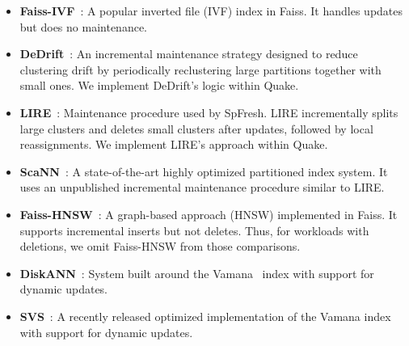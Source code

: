 \begin{itemize}[leftmargin=*, itemsep=-.25em, topsep=0pt]
    \item \textbf{Faiss-IVF}~\cite{douze2024faisslibrary}: A popular inverted file (IVF) index in Faiss. It handles updates but does no maintenance.
    \item \textbf{DeDrift}~\cite{baranchuk_dedrift_2023}: An incremental maintenance strategy designed to reduce clustering drift by periodically reclustering large partitions together with small ones. We implement DeDrift’s logic within Quake.
    \item \textbf{LIRE}~\cite{xu_spfresh_2023}: Maintenance procedure used by SpFresh. LIRE incrementally splits large clusters and deletes small clusters after updates, followed by local reassignments. We implement LIRE’s approach within Quake.
    \item \textbf{ScaNN}~\cite{guo_accelerating_2020}: A state-of-the-art highly optimized partitioned index system. It uses an unpublished incremental maintenance procedure similar to LIRE.
    \item \textbf{Faiss-HNSW}~\cite{10.1109/TPAMI.2018.2889473}: A graph-based approach (HNSW) implemented in Faiss. It supports incremental inserts but not deletes. Thus, for workloads with deletions, we omit Faiss-HNSW from those comparisons.
    \item \textbf{DiskANN}~\cite{singh2021freshdiskann}: System built around the Vamana~\cite{10.5555/3454287.3455520} index with support for dynamic updates.
    \item \textbf{SVS}~\cite{aguerrebere2024locally}: A recently released optimized implementation of the Vamana index with support for dynamic updates. 
\end{itemize}

